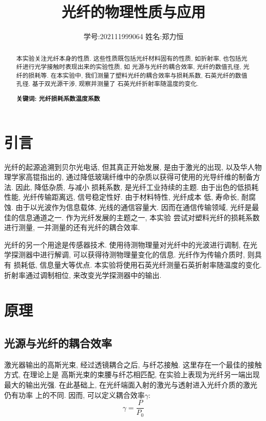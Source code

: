 \documentclass[12pt,a4paper]{article}
\title{\vspace{-4cm}\Large 光纤的物理性质与应用}  %
\author{\kaishu 学号:202111999064 \hspace{2cm} 姓名:郑力恒}   %
\date{}
\begin{document}
\maketitle

\begin{abstract}
    本实验关注光纤本身的性质. 这些性质既包括光纤材料固有的性质, 如折射率, 也包括光纤进行光学接触时表现出来的实验性质, 如
    光源与光纤的耦合效率, 光纤的数值孔径, 光纤的损耗等. 在本实验中, 我们测量了塑料光纤的耦合效率与损耗系数, 石英光纤的数值孔径. 基于双光源干涉, 观察并测量了
    石英光纤折射率随温度的变化. 

    \bf{关键词}: 光纤\quad 损耗系数\quad 温度系数
\end{abstract}

\section{引言}


光纤的起源追溯到贝尔光电话, 但其真正开始发展, 是由于激光的出现, 以及华人物理学家高锟指出的, 通过降低玻璃纤维中的杂质以获得可使用的光导纤维的制备方法. 因此, 降低杂质, 与减小
损耗系数, 是光纤工业持续的主题. 由于出色的低损耗性能, 光纤传输距离远, 信号稳定性好. 由于材料特性, 光纤成本
低, 寿命长, 耐腐蚀. 由于以光波作为信息载体, 光线的通信容量大. 因而在通信传输领域, 光纤是最佳的信息通道之一. 作为光纤发展的主题之一, 本实验
尝试对塑料光纤的损耗系数进行测量, 一并测量的还有光纤的耦合效率. 

光纤的另一个用途是传感器技术. 使用待测物理量对光纤中的光波进行调制, 在光学探测器中进行解调, 可以获得待测物理量变化的信息. 光纤作为传输介质时, 则具有
损耗低, 信息量大等优点. 本实验将使用石英光纤测量石英折射率随温度的变化. 折射率通过调制相位, 来改变光学探测器中的输出.


\section{原理}

\subsection{光源与光纤的耦合效率}
激光器输出的高斯光束, 经过透镜耦合之后, 与纤芯接触. 这里存在一个最佳的接触方式, 在理论上是
高斯光束的束腰与纤芯相匹配, 在实验上表现为光纤另一端出现最大的输出光强. 在此基础上, 在光纤端面入射的激光与透射进入光纤介质的激光仍有功率
上的不同. 因而, 可以定义耦合效率$\gamma$: 
\begin{equation}
    \gamma=\frac{P}{P_0}
\end{equation}
\end{document}
